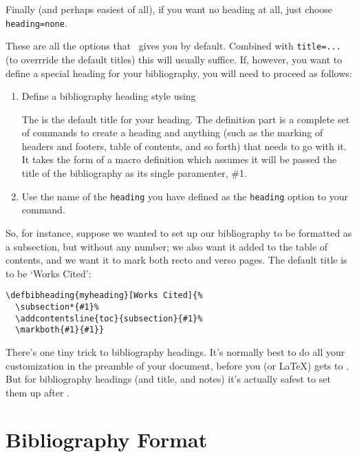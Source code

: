 Finally (and perhaps easiest of all), if you want no heading at all,
just choose \verb|heading=none|.

These are all the options that \biblatex\ gives you by
default. Combined with \verb|title=...| (to overrride the default
titles) this will usually
suffice. If, however, you want to define a special heading for your
bibliography, you will need to proceed as follows:
\begin{enumerate}
\item Define a bibliography heading style using
\begin{center}
\end{center}
The  is the default title for your heading. The
definition part is a complete set of commands to create a heading and
anything (such as the marking of headers and footers, table of
contents, and so forth) that needs to go with it. It takes the form of
a macro definition which assumes it will be passed the title of the
bibliography as its single paramenter, \#1.
\item Use the name of the \verb|heading| you have defined as the
  \verb|heading| option to your  command.
\end{enumerate}

So, for instance, suppose we wanted to set up our bibliography to be
formatted as a subsection, but without any number; we also want it
added to the table of contents, and we want it to mark both recto and
verso pages. The default title is to be `Works Cited':
\begin{verbatim}
\defbibheading{myheading}[Works Cited]{%
  \subsection*{#1}%
  \addcontentsline{toc}{subsection}{#1}%
  \markboth{#1}{#1}}
\end{verbatim}

There's one tiny trick to bibliography headings. It's normally best to
do all your customization in the preamble of your document, before you
(or \LaTeX) gets to . But for bibliography
headings (and title, and notes) it's actually safest to set them up
after .

\section{Bibliography Format}

